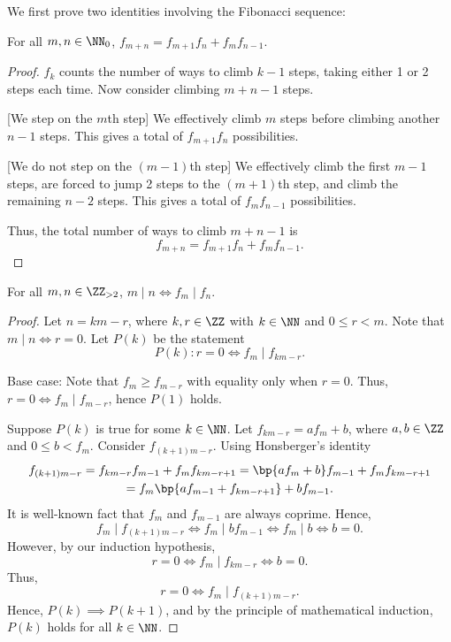 \begin{solution}
    We first prove two identities involving the Fibonacci sequence:

    \begin{lemma}
        For all $m, n \in \NN_0$, $f_{m+n} = f_{m+1} f_n + f_m f_{n-1}$.
    \end{lemma}
    \begin{proof}
        $f_k$ counts the number of ways to climb $k-1$ steps, taking either 1 or 2 steps each time. Now consider climbing $m+n-1$ steps. 
        
        [We step on the $m$th step] We effectively climb $m$ steps before climbing another $n-1$ steps. This gives a total of $f_{m+1} f_n$ possibilities.

        [We do not step on the $(m-1)$th step] We effectively climb the first $m-1$ steps, are forced to jump 2 steps to the $(m+1)$th step, and climb the remaining $n-2$ steps. This gives a total of $f_m f_{n-1}$ possibilities.

        Thus, the total number of ways to climb $m+n-1$ is \[f_{m+n} = f_{m+1} f_n + f_m f_{n-1}.\]
    \end{proof}

    \begin{lemma}\label{lem:fibonacci}
        For all $m, n \in \ZZ_{> 2}$, $m \mid n \iff f_m \mid f_n$.
    \end{lemma}
    \begin{proof}
        Let $n = km - r$, where $k, r \in \ZZ$ with $k \in \NN$ and $0 \leq r < m$. Note that $m \mid n \iff r = 0$. Let $P(k)$ be the statement \[P(k) : r = 0 \iff f_m \mid f_{km-r}.\] 
        
        Base case: Note that $f_m \geq f_{m-r}$ with equality only when $r = 0$. Thus, $r = 0 \iff f_m \mid f_{m-r}$, hence $P(1)$ holds.

        Suppose $P(k)$ is true for some $k \in \NN$. Let $f_{km-r} = a f_m + b$, where $a, b \in \ZZ$ and $0 \leq b < f_m$. Consider $f_{(k+1)m - r}$. Using Honsberger's identity
        \begin{gather*}
            f_{(k+1)m - r} = f_{km - r} f_{m-1} + f_m f_{km - r + 1} = \bp{a f_m + b} f_{m-1} + f_m f_{km -r + 1}\\
            = f_m \bp{a f_{m-1} + f_{km-r+1}} + b f_{m-1}.
        \end{gather*}
        It is well-known fact that $f_m$ and $f_{m-1}$ are always coprime. Hence, \[f_m \mid f_{(k+1)m - r} \iff f_m \mid b f_{m-1} \iff f_m \mid b \iff b = 0.\] However, by our induction hypothesis, \[r = 0 \iff f_m \mid f_{km-r} \iff b = 0.\] Thus, \[r = 0 \iff f_m \mid f_{(k+1)m - r}.\] Hence, $P(k) \implies P(k+1)$, and by the principle of mathematical induction, $P(k)$ holds for all $k \in \NN$.
    \end{proof}


\end{solution}
